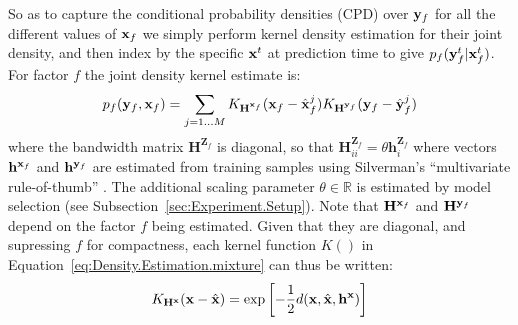 So as to capture the conditional probability densities (CPD) over $\mathbf{y}_f$ for all the different values of $\mathbf{x}_f$ we simply perform kernel density estimation for their joint density, and then  index by the specific $\mathbf{x}^t$ at prediction time to give $p_f(\mathbf{y}_f^t|\mathbf{x}_f^t)$. For factor $f$ the joint density kernel estimate is:
\begin{equation}
p_f(\by_f,\bx_f) = \mathop{\sum}_{j=1 \ldots M}
K_{\mathbf{H}^{\bx_f}}(\bx_f - \hat{\bx}_f^j)
K_{\mathbf{H}^{\by_f}}(\by_f - \hat{\by}_f^j)
\label{eq:Density.Estimation.mixture}
\end{equation}
\noindent where the bandwidth matrix  $\mathbf{H}^{\mathbf{Z}_f} $ is diagonal, so that $\mathbf{H}^{\mathbf{Z}_f}_{ii}  = \theta \mathbf{h}^{\mathbf{Z}_f}_i$ where vectors $\mathbf{h}^{\mathbf{x}_f}$ and $\mathbf{h}^{\mathbf{y}_f}$  are estimated from training samples using Silverman's ``multivariate rule-of-thumb'' \cite{scott2004multi-dimensional}. The additional scaling parameter $\theta \in \mathbb{R}$ is estimated by model selection (see Subsection~\ref{sec:Experiment.Setup}). Note that $\mathbf{H}^{\mathbf{x}_f}$ and $\mathbf{H}^{\mathbf{y}_f}$ depend on the factor $f$ being estimated. Given that they are diagonal, and supressing $f$ for compactness, each kernel function $K()$ in Equation~\eqref{eq:Density.Estimation.mixture} can thus be written:
\begin{equation}
K_{\mathbf{H}^\bx}(\bx - \hat{\bx}) = \exp \left[-\frac{1}{2}d(\bx, \hat{\bx}, \mathbf{h^{x}}) \right]
\label{eq:Density.Estimation.kernel}
\end{equation}

